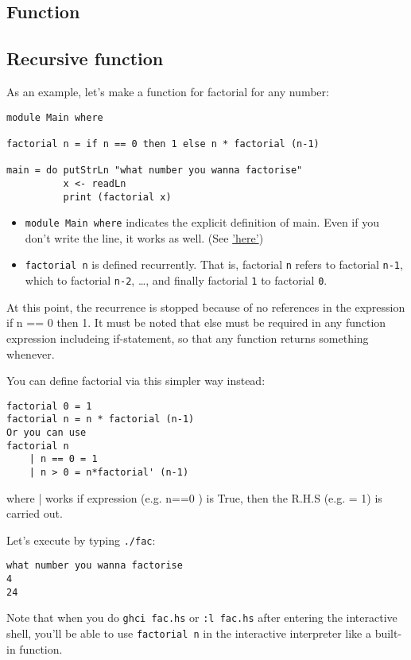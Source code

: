 \subsection{Function}

\subsection{Recursive function}
As an example, let’s make a function for factorial for any number:

\begin{lstlisting}
module Main where

factorial n = if n == 0 then 1 else n * factorial (n-1)

main = do putStrLn "what number you wanna factorise"
          x <- readLn
          print (factorial x)
\end{lstlisting}
\begin{itemize}
	\item \lstinline{module Main where} indicates the explicit definition of main. Even if you don't write the line, it works as well. (See \href{https://stackoverflow.com/questions/11112371/to-write-or-not-to-write-module-main-where-in-haskell}{'here'})
	\item \lstinline{factorial n} is defined recurrently.  That is, factorial \lstinline{n} refers to factorial \lstinline{n-1}, which to factorial \lstinline{n-2}, …, and finally factorial \lstinline{1} to factorial \lstinline{0}.  
\end{itemize}

At this point, the recurrence is stopped because of no references in the expression if n == 0 then 1. 
It must be noted that else must be required in any function expression includeing if-statement, 
so that any function returns something whenever.

You can define factorial via this simpler way instead:
\begin{lstlisting}
factorial 0 = 1
factorial n = n * factorial (n-1)
Or you can use 
factorial n
    | n == 0 = 1
    | n > 0 = n*factorial' (n-1)
\end{lstlisting}
where | works if expression (e.g. n==0 ) is True, then the R.H.S (e.g. = 1) is carried out.   

Let’s execute by typing \lstinline{./fac}:
\begin{lstlisting}
what number you wanna factorise
4
24
\end{lstlisting}

Note that when you do \lstinline{ghci fac.hs} or \lstinline{:l fac.hs} after entering the interactive shell, you’ll be able to use \lstinline{factorial n} in the interactive interpreter like a built-in function. 

